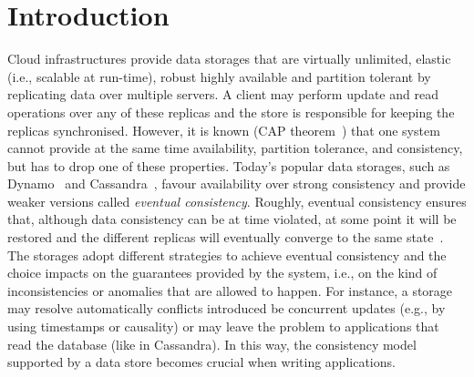 
\section{Introduction}

Cloud infrastructures provide data storages that are virtually unlimited, elastic (i.e., scalable at run-time), 
robust   highly available and partition tolerant by 
replicating data over multiple servers. A client may  perform update and 
read operations over any of these replicas and the  store is responsible for keeping 
the  replicas synchronised. 
However, it is known (CAP theorem~\cite{CAP}) that one system cannot provide at the same time availability, 
partition tolerance, and consistency, but has to drop one of these properties. Today's popular 
data storages, such as Dynamo~\cite{DeCandia:2007:DAH:1294261.1294281} and  Cassandra~\cite{lakshman2010cassandra}, favour 
availability over strong consistency and provide weaker versions called \emph{eventual consistency}.
Roughly, eventual consistency ensures that, although data consistency can be at time violated, at some point it will be restored
and the different replicas will eventually converge to the same state~\cite{DBLP:journals/cacm/BailisG13}.
The  storages adopt different strategies to achieve eventual consistency and the choice  
impacts on the  guarantees provided by the system, i.e., on the kind of 
inconsistencies or anomalies that are allowed to happen. For instance, a storage may
resolve automatically conflicts introduced be concurrent updates (e.g., by using timestamps or causality) or  
may leave the problem to applications that read the database (like in Cassandra).
In this way, the consistency model supported by a data store becomes crucial when writing applications. 

